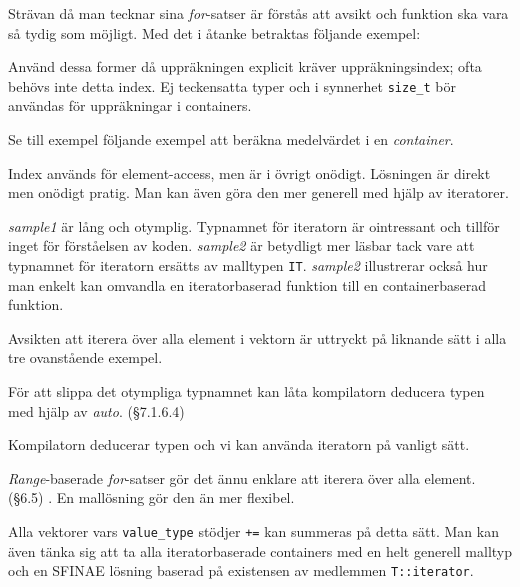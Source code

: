 \documentclass[a4paper,portrait]{miunart} %
\begin{document}
Strävan då man tecknar sina \emph{for}-satser är förstås att avsikt och 
funktion ska vara så tydig som möjligt. Med det i åtanke betraktas följande 
exempel:



Använd dessa former då uppräkningen explicit kräver uppräkningsindex; ofta 
behövs inte detta index. Ej teckensatta typer och i synnerhet \texttt{size\_t} 
bör användas för uppräkningar i containers.

Se till exempel följande exempel att beräkna medelvärdet i en \emph{container}.



Index används för element-access, men är i övrigt onödigt. Lösningen är direkt 
men onödigt pratig. Man kan även göra den mer generell med hjälp av iteratorer. 



\emph{sample1} är lång och otymplig. Typnamnet för iteratorn är ointressant och 
tillför inget för förståelsen av koden.  \emph{sample2} är betydligt mer läsbar 
tack vare att typnamnet för iteratorn ersätts av malltypen \texttt{IT}.  
\emph{sample2} illustrerar också hur man enkelt kan omvandla en iteratorbaserad 
funktion till en containerbaserad funktion.

Avsikten att iterera över alla element i vektorn är uttryckt på liknande sätt 
i alla tre ovanstående exempel.

För att slippa det otympliga typnamnet kan låta kompilatorn deducera typen med 
hjälp av \emph{auto}. (§7.1.6.4) \cite{ISO:n3337}



Kompilatorn deducerar typen och vi kan använda iteratorn på vanligt sätt.

\emph{Range}-baserade \emph{for}-satser gör det ännu enklare att iterera över 
alla element. (§6.5) \cite{ISO:n3337}. En mallösning gör den än mer flexibel. 



Alla vektorer vars \texttt{value\_type} stödjer \texttt{+=} kan summeras på 
detta sätt.  Man kan även tänka sig att ta alla iteratorbaserade containers med 
en helt generell malltyp och en SFINAE lösning baserad på existensen av 
medlemmen \texttt{T::iterator}. 
\end{document}
